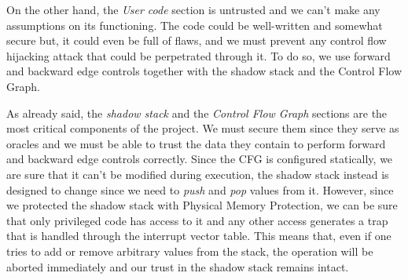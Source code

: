 On the other hand, the \textit{User code} section is untrusted and we can't make
any assumptions on its functioning. The code could be well-written and somewhat
secure but, it could even be full of flaws, and we must prevent any control flow
hijacking attack that could be perpetrated through it. To do so, we use forward
and backward edge controls together with the shadow stack and the Control Flow
Graph.

As already said, the \textit{shadow stack} and the \textit{Control Flow Graph} sections
are the most critical components of the project. We must secure them since they
serve as oracles and we must be able to trust the data they contain to perform
forward and backward edge controls correctly. Since the CFG is configured statically,
we are sure that it can't be modified during execution, the shadow stack instead
is designed to change since we need to \textit{push} and \textit{pop} values from
it. However, since we protected the shadow stack with Physical Memory Protection,
we can be sure that only privileged code has access to it and any other access
generates a trap that is handled through the interrupt vector table. This means that,
even if one tries to add or remove arbitrary values from the stack, the operation
will be aborted immediately and our trust in the shadow stack remains intact.

